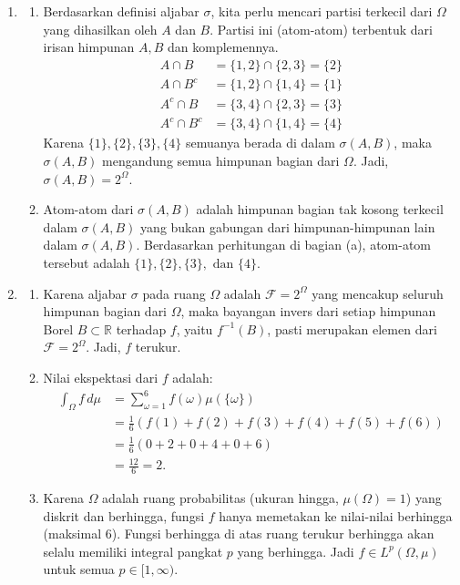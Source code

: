 \documentclass{article}
\begin{document}
\begin{enumerate}
  \item
        \begin{enumerate}[label=(\alph*)]
          \item Berdasarkan definisi aljabar $\sigma$, kita perlu mencari partisi terkecil dari $\Omega$ yang dihasilkan oleh $A$ dan $B$. Partisi ini (atom-atom) terbentuk dari irisan himpunan $A, B$ dan komplemennya.
                \begin{align*}
                  A \cap B     & = \{1, 2\} \cap \{2, 3\} = \{2\} \\
                  A \cap B^c   & = \{1, 2\} \cap \{1, 4\} = \{1\} \\
                  A^c \cap B   & = \{3, 4\} \cap \{2, 3\} = \{3\} \\
                  A^c \cap B^c & = \{3, 4\} \cap \{1, 4\} = \{4\}
                \end{align*}
                Karena $\{1\}, \{2\}, \{3\}, \{4\}$ semuanya berada di dalam $\sigma(A, B)$, maka $\sigma(A, B)$ mengandung semua himpunan bagian dari $\Omega$.
                Jadi, $\sigma(A, B) = 2^\Omega$.
          \item Atom-atom dari $\sigma(A, B)$ adalah himpunan bagian tak kosong terkecil dalam $\sigma(A, B)$ yang bukan gabungan dari himpunan-himpunan lain dalam $\sigma(A, B)$.
                Berdasarkan perhitungan di bagian (a), atom-atom tersebut adalah $\{1\}, \{2\}, \{3\}, \text{ dan } \{4\}$.
        \end{enumerate}

  \item
        \begin{enumerate}[label=(\alph*)]
          \item Karena aljabar $\sigma$ pada ruang $\Omega$ adalah $\mathcal{F} = 2^\Omega$ yang mencakup seluruh himpunan bagian dari $\Omega$, maka bayangan invers dari setiap himpunan Borel $B \subset \mathbb{R}$ terhadap $f$, yaitu $f^{-1}(B)$, pasti merupakan elemen dari $\mathcal{F} = 2^\Omega$. Jadi, $f$ terukur.
          \item Nilai ekspektasi dari $f$ adalah:
                \begin{align*}
                  \int_\Omega f \, d\mu & = \sum_{\omega=1}^6 f(\omega)\mu(\{\omega\})            \\
                                        & = \frac{1}{6}\left(f(1)+f(2)+f(3)+f(4)+f(5)+f(6)\right) \\
                                        & = \frac{1}{6}(0 + 2 + 0 + 4 + 0 + 6)                    \\
                                        & = \frac{12}{6} = 2.
                \end{align*}
          \item Karena $\Omega$ adalah ruang probabilitas (ukuran hingga, $\mu(\Omega) = 1$) yang diskrit dan berhingga, fungsi $f$ hanya memetakan ke nilai-nilai berhingga (maksimal 6). Fungsi berhingga di atas ruang terukur berhingga akan selalu memiliki integral pangkat $p$ yang berhingga. Jadi $f \in L^p(\Omega, \mu)$ untuk semua $p \in [1, \infty)$.
        \end{enumerate}


\end{enumerate}
\end{document}

